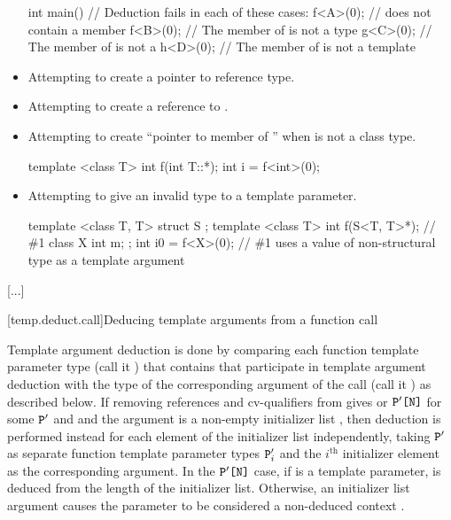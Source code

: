 \documentclass{wg21}
\begin{document}
\begin{note}
\begin{itemize}
\begin{example}
\begin{codeblock}
    int main() {
        // Deduction fails in each of these cases:
        f<A>(0);          //  does not contain a member 
        f<B>(0);          // The  member of  is not a type
        g<C>(0);          // The  member of  is not a 
        h<D>(0);          // The  member of  is not a template
    }
\end{codeblock}
\end{example}
\item
Attempting to create a pointer to reference type.
\item
Attempting to create a reference to .
\item
Attempting to create ``pointer to member of '' when  is not a
class type.
\begin{example}
    \begin{codeblock}
        template <class T> int f(int T::*);
        int i = f<int>(0);
    \end{codeblock}
\end{example}
\item
Attempting to give an invalid type to a  template parameter.
\begin{example}
    \begin{codeblock}
        template <class T, T> struct S {};
        template <class T> int f(S<T, T{}>*);   // \#1
        class X {
            int m;
        };
        int i0 = f<X>(0);   // \#1 uses a value of non-structural type  as a  template argument
    \end{codeblock}
\end{example}
\end{itemize}
\end{note}

\textcolor{noteclr}{[...]}

[temp.deduct.call]{Deducing template arguments from a function call}

\pnum
Template argument deduction is done by comparing each function
template parameter type (call it
)
that contains  that participate in template argument deduction
with the type of the corresponding argument of the call (call it
)
as described below.
If removing references and cv-qualifiers from  gives
or $\texttt{P}'\texttt{[N]}$
for some $\texttt{P}'$ and  and the
argument is a non-empty initializer list , then deduction is
performed instead for each element of the initializer list independently,
taking $\texttt{P}'$
as separate function template parameter types $\texttt{P}'_i$
and the $i^\text{th}$ initializer element as the corresponding argument.
In the $\texttt{P}'\texttt{[N]}$ case, if  is a  template parameter,
 is deduced from the length of the initializer list.
Otherwise, an initializer list argument causes the
parameter to be considered a non-deduced context .
\end{document}
